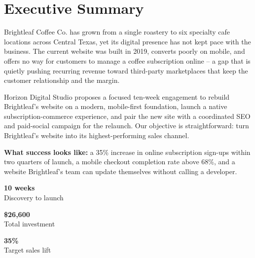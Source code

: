 \section{Executive Summary}

Brightleaf Coffee Co. has grown from a single roastery to six specialty cafe locations across
Central Texas, yet its digital presence has not kept pace with the business. The current website
was built in 2019, converts poorly on mobile, and offers no way for customers to manage a coffee
subscription online -- a gap that is quietly pushing recurring revenue toward third-party
marketplaces that keep the customer relationship and the margin.

Horizon Digital Studio proposes a focused ten-week engagement to rebuild Brightleaf's website on
a modern, mobile-first foundation, launch a native subscription-commerce experience, and pair the
new site with a coordinated SEO and paid-social campaign for the relaunch. Our objective is
straightforward: turn Brightleaf's website into its highest-performing sales channel.

\begin{tcolorbox}[noteboxstyle]
  \textbf{\color{accent}What success looks like:} a 35\% increase in online subscription
  sign-ups within two quarters of launch, a mobile checkout completion rate above 68\%, and
  a website Brightleaf's team can update themselves without calling a developer.
\end{tcolorbox}

\vspace{0.6em}
\noindent
\begin{minipage}[t]{0.315\linewidth}
  \begin{tcolorbox}[statbox]
    \centering
    {\Large\bfseries\color{accent}10 weeks}\\
    {\small\color{softgray}Discovery to launch}
  \end{tcolorbox}
\end{minipage}\hfill
\begin{minipage}[t]{0.315\linewidth}
  \begin{tcolorbox}[statbox]
    \centering
    {\Large\bfseries\color{accent}\$26,600}\\
    {\small\color{softgray}Total investment}
  \end{tcolorbox}
\end{minipage}\hfill
\begin{minipage}[t]{0.315\linewidth}
  \begin{tcolorbox}[statbox]
    \centering
    {\Large\bfseries\color{accent}35\%}\\
    {\small\color{softgray}Target sales lift}
  \end{tcolorbox}
\end{minipage}

